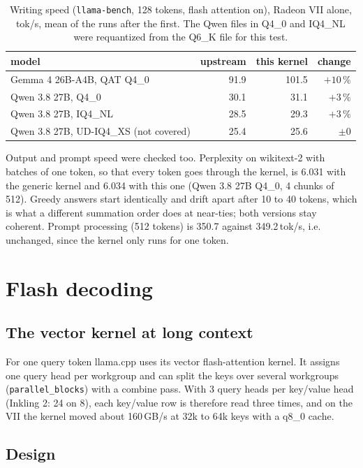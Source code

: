 \documentclass[11pt,a4paper]{article}
\newcommand{\code}[1]{\texttt{#1}}
\begin{document}
\begin{table}[ht]
\centering
\caption{Writing speed (\code{llama-bench}, 128 tokens, flash attention on), Radeon VII alone, tok/s, mean of the runs
after the first. The Qwen files in Q4\_0 and IQ4\_NL were requantized from the Q6\_K file for this test.}
\label{tab:models}
\begin{tabular}{lrrr}
\toprule
model & upstream & this kernel & change \\
\midrule
Gemma 4 26B-A4B, QAT Q4\_0 & 91.9 & 101.5 & $+10\,\%$ \\
Qwen 3.8 27B, Q4\_0 & 30.1 & 31.1 & $+3\,\%$ \\
Qwen 3.8 27B, IQ4\_NL & 28.5 & 29.3 & $+3\,\%$ \\
Qwen 3.8 27B, UD-IQ4\_XS (not covered) & 25.4 & 25.6 & $\pm 0$ \\
\bottomrule
\end{tabular}
\end{table}

Output and prompt speed were checked too. Perplexity on wikitext-2 with batches of one token, so that every token goes
through the kernel, is 6.031 with the generic kernel and 6.034 with this one (Qwen 3.8 27B Q4\_0, 4 chunks of 512).
Greedy answers start identically and drift apart after 10 to 40 tokens, which is what a different summation order
does at near-ties; both versions stay coherent. Prompt processing (512 tokens) is 350.7 against 349.2\,tok/s, i.e.
unchanged, since the kernel only runs for one token.

\section{Flash decoding}

\subsection{The vector kernel at long context}

For one query token llama.cpp uses its vector flash-attention kernel. It assigns one query head per workgroup and can
split the keys over several workgroups (\code{parallel\_blocks}) with a combine pass. With 3 query heads per key/value
head (Inkling 2: 24 on 8), each key/value row is therefore read three times, and on the VII the kernel moved about
160\,GB/s at 32k to 64k keys with a q8\_0 cache.

\subsection{Design}
\end{document}
